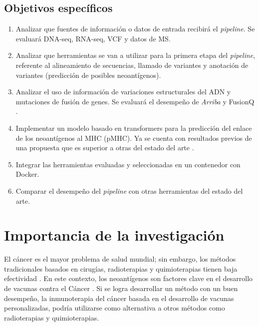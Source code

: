 \documentclass[a4paper]{article}
\begin{document}
	\subsection{Objetivos específicos}
	\begin{enumerate}
		\item Analizar que fuentes de información o datos de entrada recibirá el \textit{pipeline}. Se evaluará DNA-seq, RNA-seq, VCF y datos de MS.
		
		\item Analizar que herramientas se van a utilizar para la primera etapa del \textit{pipeline}, referente al alineamiento de secuencias, llamado de variantes y  anotación de variantes (predicción de posibles neoantígenos). 
		
		\item Analizar el uso de información de variaciones estructurales del ADN y mutaciones de fusión de genes. Se evaluará el desempeño de \textit{Arriba} \citep{uhrig2021accurate} y FusionQ \citep{liu2013fusionq}.
		 
		\item Implementar un modelo basado en transformers para la predicción del enlace de los neoantígenos al MHC (pMHC). Ya se cuenta con resultados previos de una propuesta que es superior a otras del estado del arte \citep{arceda2023neoantigen}.
		
		\item Integrar las herramientas evaluadas y seleccionadas en un contenedor con Docker.
		\item Comparar el desempeño del \textit{pipeline} con otras herramientas del estado del arte.

		

		
	\end{enumerate}

	
\section{Importancia de la investigación}

El cáncer es el mayor problema de salud mundial; sin embargo, los métodos tradicionales basados en cirugías, radioterapias y quimioterapias tienen baja efectividad \citep{peng2019neoantigen}. En este contexto, los neoantígenos son factores clave en el desarrollo de vacunas contra el Cáncer  \citep{borden2022cancer,chen2021challenges,gopanenko2020main}. Si se logra desarrollar un método con un buen desempeño, la inmunoterapia del cáncer basada en el desarrollo de vacunas personalizadas, podría utilizarse como alternativa a otros métodos como radioterapias y quimioterapias. \\
\end{document}
